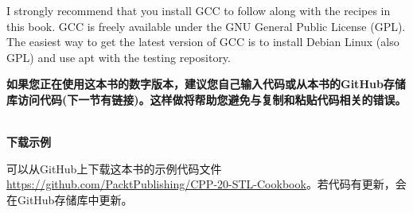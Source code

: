 I strongly recommend that you install GCC to follow along with the recipes in this book. GCC is freely available under the GNU General Public License (GPL). The easiest way to get the latest version of GCC is to install Debian Linux (also GPL) and use apt with the testing repository.

\textbf{如果您正在使用这本书的数字版本，建议您自己输入代码或从本书的GitHub存储库访问代码(下一节有链接)。这样做将帮助您避免与复制和粘贴代码相关的错误。}


\hspace*{\fill} \\ %
\noindent
\textbf{下载示例}

可以从GitHub上下载这本书的示例代码文件\url{https://github.com/PacktPublishing/CPP-20-STL-Cookbook}。若代码有更新，会在GitHub存储库中更新。



















